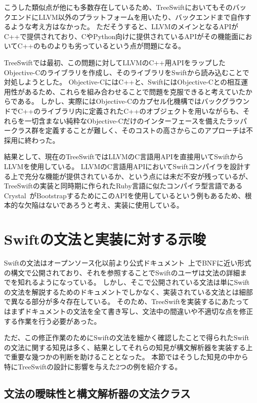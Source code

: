 こうした類似点が他にも多数存在しているため、TreeSwiftにおいてもそのバックエンドにLLVM以外のプラットフォームを用いたり、バックエンドまで自作するような考え方はなかった。
ただそうすると、LLVMのメインとなるAPIがC++で提供されており、CやPython向けに提供されているAPIがその機能面においてC++のものよりも劣っているという点が問題になる。

TreeSwiftでは最初、この問題に対してLLVMのC++用APIをラップしたObjective-Cのライブラリを作成し、そのライブラリをSwiftから読み込むことで対処しようとした。
Objective-CにはC++と、SwiftにはObjective-Cとの相互運用性があるため、これらを組み合わせることで問題を克服できると考えていたからである。
しかし、実際にはObjective-Cのカプセル化機構ではバックグラウンドでC++のライブラリ内に定義されたC++のオブジェクトを用いながらも、それらを一切含まない純粋なObjective-Cだけのインターフェースを備えたラッパークラス群を定義することが難しく、そのコストの高さからこのアプローチは不採用に終わった。

結果として、現在のTreeSwiftではLLVMのC言語用APIを直接用いてSwiftからLLVMを使用している。
LLVMのC言語用APIにおいてSwiftコンパイラを設計する上で充分な機能が提供されているか、という点には未だ不安が残っているが、TreeSwiftの実装と同時期に作られたRuby言語に似たコンパイラ型言語であるCrystal~\cite{crystal}がBootstrapするためにこのAPIを使用しているという例もあるため、根本的な欠陥はないであろうと考え、実装に使用している。


\section{Swiftの文法と実装に対する示唆}

Swiftの文法はオープンソース化以前より公式ドキュメント~\cite{swift-grammar}上でBNFに近い形式の構文で公開されており、それを参照することでSwiftのユーザは文法の詳細までを知れるようになっている。
しかし、そこで公開されている文法は単にSwiftの文法を解説するためのドキュメントでしかなく、実装されている文法とは細部で異なる部分が多々存在している。
そのため、TreeSwiftを実装するにあたってはまずドキュメントの文法を全て書き写し、文法中の間違いや不適切な点を修正する作業を行う必要があった。

ただ、この修正作業のためにSwiftの文法を細かく確認したことで得られたSwiftの文法に関する知見は多く、結果としてそれらの知見が構文解析器を実装する上で重要な幾つかの判断を助けることとなった。
本節ではそうした知見の中から特にTreeSwiftの設計に影響を与えた2つの例を紹介する。

\subsection{文法の曖昧性と構文解析器の文法クラス}

